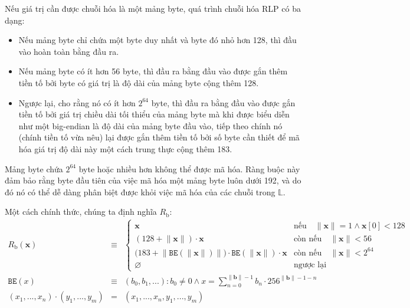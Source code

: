 \documentclass[9pt,oneside]{amsart}
\makeatletter
\newcommand{\linkdest}[1]{\Hy@raisedlink{\hypertarget{#1}{}}}
\makeatother
\begin{document}
\hypertarget{RLP_serialisation_of_a_byte_array_R__b_word_def}{}\linkdest{R__b}Nếu giá trị cần được chuỗi hóa là một mảng byte, quá trình chuỗi hóa RLP có ba dạng:

\begin{itemize}
\item Nếu mảng byte chỉ chứa một byte duy nhất và byte đó nhỏ hơn 128, thì đầu vào hoàn toàn bằng đầu ra.
\item Nếu mảng byte có ít hơn 56 byte, thì đầu ra bằng đầu vào được gắn thêm tiền tố bởi byte có giá trị là độ dài của mảng byte cộng thêm 128.
\item Ngược lại, cho rằng nó có ít hơn $2^{64}$ byte, thì đầu ra bằng đầu vào được gắn tiền tố bởi giá trị chiều dài tối thiểu của mảng byte mà khi được biểu diễn như một big-endian là độ dài của mảng byte đầu vào, tiếp theo chính nó (chính tiền tố vừa nêu) lại được gắn thêm tiền tố bởi số byte cần thiết để mã hóa giá trị độ dài này một cách trung thực cộng thêm 183.
\end{itemize}

Mảng byte chứa $2^{64}$ byte hoặc nhiều hơn không thể được mã hóa. Ràng buộc này đảm bảo rằng byte đầu tiên của việc mã hóa một mảng byte luôn dưới 192, và do đó nó có thể dễ dàng phân biệt được khỏi việc mã hóa của các chuỗi trong $\mathbb{L}$.

\hypertarget{RLP_serialisation_of_a_byte_array_R__b_math_def}{}Một cách chính thức, chúng ta định nghĩa $R_{\mathrm{b}}$:
\begin{eqnarray}
R_{\mathrm{b}}(\mathbf{x}) & \equiv & \begin{cases}
\mathbf{x} & \text{nếu} \quad \lVert \mathbf{x} \rVert = 1 \wedge \mathbf{x}[0] < 128 \\
(128 + \lVert \mathbf{x} \rVert) \cdot \mathbf{x} & \text{còn nếu} \quad \lVert \mathbf{x} \rVert < 56 \\
\big(183 + \big\lVert \mathtt{BE}(\lVert \mathbf{x} \rVert) \big\rVert \big) \cdot \mathtt{BE}(\lVert \mathbf{x} \rVert) \cdot \mathbf{x} & \text{còn nếu} \quad \lVert \mathbf{x} \rVert < 2^{64} \\
\varnothing & \text{ngược lại}
\end{cases} \\
\label{eq:BE}
\mathtt{BE}(x) & \equiv & (b_0, b_1, ...): b_0 \neq 0 \wedge x = \sum_{n = 0}^{\lVert \mathbf{b} \rVert - 1} b_n \cdot 256^{\lVert \mathbf{b} \rVert - 1 - n} \\
(x_1, ..., x_n) \cdot (y_1, ..., y_m) & = & (x_1, ..., x_n, y_1, ..., y_m)
\end{eqnarray}
\end{document}
